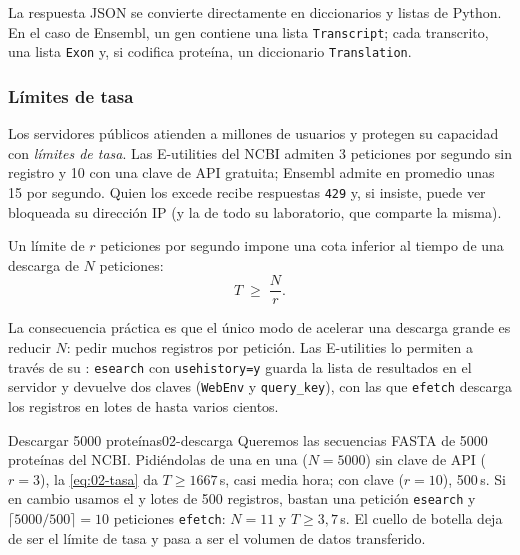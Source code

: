 La respuesta JSON se convierte directamente en diccionarios y listas de Python. En el caso de Ensembl, un gen contiene una lista \texttt{Transcript}; cada transcrito, una lista \texttt{Exon} y, si codifica proteína, un diccionario \texttt{Translation}.



\subsubsection{Límites de tasa}

Los servidores públicos atienden a millones de usuarios y protegen su capacidad con \emph{límites de tasa}. Las E-utilities del NCBI admiten 3 peticiones por segundo sin registro y 10 con una clave de API gratuita; Ensembl admite en promedio unas 15 por segundo. Quien los excede recibe respuestas \texttt{429} y, si insiste, puede ver bloqueada su dirección IP (y la de todo su laboratorio, que comparte la misma).

Un límite de $r$ peticiones por segundo impone una cota inferior al tiempo de una descarga de $N$ peticiones:
\begin{equation}\label{eq:02-tasa}
T \;\ge\; \frac{N}{r}.
\end{equation}
\begin{simbolos}
\end{simbolos}
La consecuencia práctica es que el único modo de acelerar una descarga grande es reducir $N$: pedir muchos registros por petición. Las E-utilities lo permiten a través de su : \texttt{esearch} con \texttt{usehistory=y} guarda la lista de resultados en el servidor y devuelve dos claves (\texttt{WebEnv} y \texttt{query\_key}), con las que \texttt{efetch} descarga los registros en lotes de hasta varios cientos.



\begin{ejemplo}{Descargar \num{5000} proteínas}{02-descarga}
Queremos las secuencias FASTA de \num{5000} proteínas del NCBI. Pidiéndolas de una en una ($N=5000$) sin clave de API ($r=3$), la \cref{eq:02-tasa} da $T\ge \num{1667}$\,s, casi media hora; con clave ($r=10$), 500\,s. Si en cambio usamos el  y lotes de 500 registros, bastan una petición \texttt{esearch} y $\lceil 5000/500\rceil=10$ peticiones \texttt{efetch}: $N=11$ y $T \ge 3{,}7$\,s. El cuello de botella deja de ser el límite de tasa y pasa a ser el volumen de datos transferido.
\end{ejemplo}


